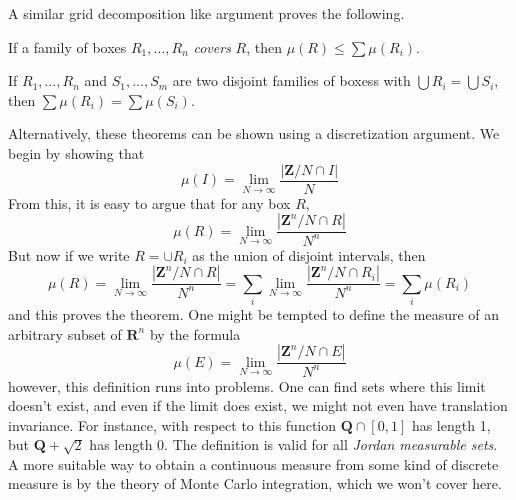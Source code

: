 A similar grid decomposition like argument proves the following.

\begin{lemma}
    If a family of boxes $R_1, \dots, R_n$ {\it covers} $R$, then $\mu(R) \leq \sum \mu(R_i)$.
\end{lemma}

\begin{lemma}
    If $R_1, \dots, R_n$ and $S_1, \dots, S_m$ are two disjoint families of boxess with $\bigcup R_i = \bigcup S_i$, then $\sum \mu(R_i) = \sum \mu(S_i)$.
\end{lemma}

Alternatively, these theorems can be shown using a discretization argument. We begin by showing that
%
\[ \mu(I) = \lim_{N \to \infty} \frac{|\mathbf{Z}/N \cap I|}{N} \]
%
From this, it is easy to argue that for any box $R$,
%
\[ \mu(R) = \lim_{N \to \infty} \frac{|\mathbf{Z}^n/N \cap R|}{N^n} \]
%
But now if we write $R = \cup R_i$ as the union of disjoint intervals, then
%
\[ \mu(R) = \lim_{N \to \infty} \frac{|\mathbf{Z}^n/N \cap R|}{N^n} = \sum_i \lim_{N \to \infty} \frac{|\mathbf{Z}^n/N \cap R_i|}{N^n} = \sum_i \mu(R_i) \]
%
and this proves the theorem. One might be tempted to define the measure of an arbitrary subset of $\mathbf{R}^n$ by the formula
%
\[ \mu(E) = \lim_{N \to \infty} \frac{|\mathbf{Z}^n/N \cap E|}{N^n} \]
%
however, this definition runs into problems. One can find sets where this limit doesn't exist, and even if the limit does exist, we might not even have translation invariance. For instance, with respect to this function $\mathbf{Q} \cap [0,1]$ has length 1, but $\mathbf{Q} + \sqrt{2}$ has length 0. The definition is valid for all {\it Jordan measurable sets}. A more suitable way to obtain a continuous measure from some kind of discrete measure is by the theory of Monte Carlo integration, which we won't cover here.

%
%
%
%
%
%
%
%
%
%
%

